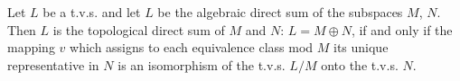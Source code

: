 Let $L$ be a t.v.s. and let $L$ be the algebraic direct sum of the subspaces $M$, $N$. Then $L$ is the topological direct sum of $M$ and $N$: $L = M \oplus N$, if and only if the mapping $v$ which assigns to each equivalence class mod $M$ its unique representative in $N$ is an isomorphism of the t.v.s. $L/M$ onto the t.v.s. $N$.
